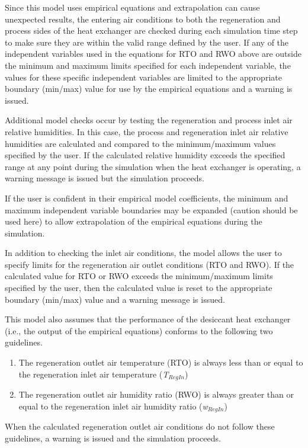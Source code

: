 Since this model uses empirical equations and extrapolation can cause unexpected results, the entering air conditions to both the regeneration and process sides of the heat exchanger are checked during each simulation time step to make sure they are within the valid range defined by the user. If any of the independent variables used in the equations for RTO and RWO above are outside the minimum and maximum limits specified for each independent variable, the values for these specific independent variables are limited to the appropriate boundary (min/max) value for use by the empirical equations and a warning is issued.

Additional model checks occur by testing the regeneration and process inlet air relative humidities. In this case, the process and regeneration inlet air relative humidities are calculated and compared to the minimum/maximum values specified by the user. If the calculated relative humidity exceeds the specified range at any point during the simulation when the heat exchanger is operating, a warning message is issued but the simulation proceeds.

If the user is confident in their empirical model coefficients, the minimum and maximum independent variable boundaries may be expanded (caution should be used here) to allow extrapolation of the empirical equations during the simulation.

In addition to checking the inlet air conditions, the model allows the user to specify limits for the regeneration air outlet conditions (RTO and RWO). If the calculated value for RTO or RWO exceeds the minimum/maximum limits specified by the user, then the calculated value is reset to the appropriate boundary (min/max) value and a warning message is issued.

This model also assumes that the performance of the desiccant heat exchanger (i.e., the output of the empirical equations) conforms to the following two guidelines.

\begin{enumerate}
\item The regeneration outlet air temperature (RTO) is always less than or equal to the regeneration inlet air temperature (\emph{T\(_{RegIn}\)})
\item The regeneration outlet air humidity ratio (RWO) is always greater than or equal to the regeneration inlet air humidity ratio (\emph{w\(_{RegIn}\)})
\end{enumerate}

When the calculated regeneration outlet air conditions do not follow these guidelines, a warning is issued and the simulation proceeds.

